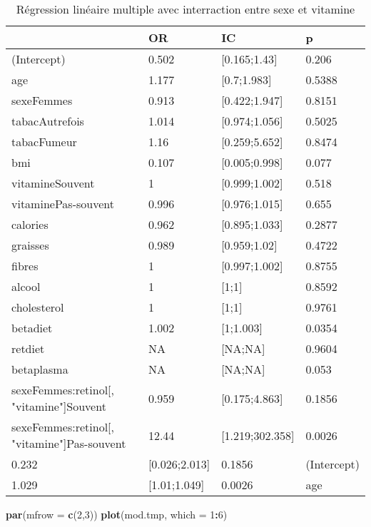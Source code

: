 \documentclass[]{article}
\newenvironment{Shaded}{\begin{snugshade}}{\end{snugshade}}
\newcommand{\KeywordTok}[1]{\textcolor[rgb]{0.13,0.29,0.53}{\textbf{#1}}}
\newcommand{\DataTypeTok}[1]{\textcolor[rgb]{0.13,0.29,0.53}{#1}}
\newcommand{\DecValTok}[1]{\textcolor[rgb]{0.00,0.00,0.81}{#1}}
\newcommand{\OperatorTok}[1]{\textcolor[rgb]{0.81,0.36,0.00}{\textbf{#1}}}
\newcommand{\NormalTok}[1]{#1}
\begin{document}
\begin{table}

\caption{\label{tab:unnamed-chunk-84}Régression linéaire multiple avec interraction entre sexe et vitamine}
\centering
\begin{tabular}[t]{l|l|l|l}
\hline
  & OR & IC & p\\
\hline
\rowcolor[HTML]{BBD2E1}  (Intercept) & 0.502 & [0.165;1.43] & 0.206\\
\hline
age & 1.177 & [0.7;1.983] & 0.5388\\
\hline
\rowcolor[HTML]{BBD2E1}  sexeFemmes & 0.913 & [0.422;1.947] & 0.8151\\
\hline
tabacAutrefois & 1.014 & [0.974;1.056] & 0.5025\\
\hline
\rowcolor[HTML]{BBD2E1}  tabacFumeur & 1.16 & [0.259;5.652] & 0.8474\\
\hline
bmi & 0.107 & [0.005;0.998] & 0.077\\
\hline
\rowcolor[HTML]{BBD2E1}  vitamineSouvent & 1 & [0.999;1.002] & 0.518\\
\hline
vitaminePas-souvent & 0.996 & [0.976;1.015] & 0.655\\
\hline
\rowcolor[HTML]{BBD2E1}  calories & 0.962 & [0.895;1.033] & 0.2877\\
\hline
graisses & 0.989 & [0.959;1.02] & 0.4722\\
\hline
\rowcolor[HTML]{BBD2E1}  fibres & 1 & [0.997;1.002] & 0.8755\\
\hline
alcool & 1 & [1;1] & 0.8592\\
\hline
\rowcolor[HTML]{BBD2E1}  cholesterol & 1 & [1;1] & 0.9761\\
\hline
betadiet & 1.002 & [1;1.003] & 0.0354\\
\hline
\rowcolor[HTML]{BBD2E1}  retdiet & NA & [NA;NA] & 0.9604\\
\hline
betaplasma & NA & [NA;NA] & 0.053\\
\hline
\rowcolor[HTML]{BBD2E1}  sexeFemmes:retinol[, "vitamine"]Souvent & 0.959 & [0.175;4.863] & 0.1856\\
\hline
sexeFemmes:retinol[, "vitamine"]Pas-souvent & 12.44 & [1.219;302.358] & 0.0026\\
\hline
\rowcolor[HTML]{BBD2E1}  0.232 & [0.026;2.013] & 0.1856 & (Intercept)\\
\hline
1.029 & [1.01;1.049] & 0.0026 & age\\
\hline
\end{tabular}
\end{table}

\begin{Shaded}
\begin{Highlighting}[]
\KeywordTok{par}\NormalTok{(}\DataTypeTok{mfrow =} \KeywordTok{c}\NormalTok{(}\DecValTok{2}\NormalTok{,}\DecValTok{3}\NormalTok{))}
\KeywordTok{plot}\NormalTok{(mod.tmp, }\DataTypeTok{which =} \DecValTok{1}\OperatorTok{:}\DecValTok{6}\NormalTok{)}
\end{Highlighting}
\end{Shaded}
\end{document}
